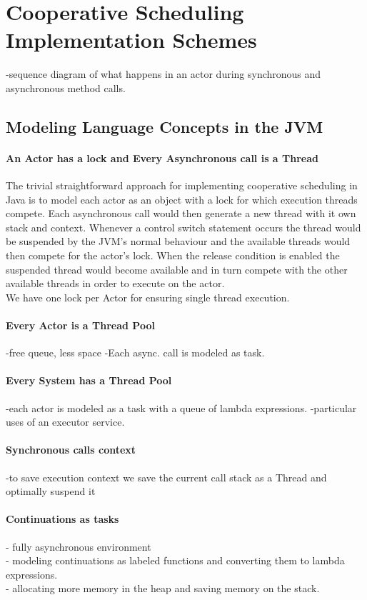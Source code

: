 \section{Cooperative Scheduling Implementation Schemes}

-sequence diagram of what happens in an actor during synchronous and asynchronous method calls.

\subsection{Modeling Language Concepts in the JVM}
\paragraph{An Actor has a lock and Every Asynchronous call is a Thread}
The trivial straightforward approach for implementing cooperative scheduling in Java is to model each actor as an object with a lock for which execution threads compete. Each asynchronous call would then generate a new thread with it own stack and context. Whenever a control switch statement occurs the thread would be suspended by the JVM's normal behaviour and the available threads would then compete for the actor's lock. When the release condition is enabled the suspended thread would become available and in turn compete with the other available threads in order to execute on the actor. \\
We have one lock per Actor for ensuring single thread execution.

\paragraph{Every Actor is a Thread Pool}
-free queue, less space
-Each async. call is modeled as task.

\paragraph{Every System has a Thread Pool}
-each actor is modeled as a task with a queue of lambda expressions.
-particular uses of an executor service.

\paragraph{Synchronous calls context}
-to save execution context we save the current call stack as a Thread and optimally suspend it

\paragraph{Continuations as tasks}
- fully asynchronous environment\\
- modeling continuations as labeled functions and converting them to lambda expressions.\\
- allocating more memory in the heap and saving memory on the stack.\\

